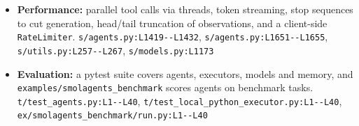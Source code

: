 \begin{itemize}
\item \textbf{Performance:} parallel tool calls via threads, token streaming, stop sequences to cut generation, head/tail truncation of observations, and a client-side \texttt{RateLimiter}. \texttt{s/\allowbreak{}agents.\allowbreak{}py:\allowbreak{}L1419-\allowbreak{}-\allowbreak{}L1432}, \texttt{s/\allowbreak{}agents.\allowbreak{}py:\allowbreak{}L1651-\allowbreak{}-\allowbreak{}L1655}, \texttt{s/\allowbreak{}utils.\allowbreak{}py:\allowbreak{}L257-\allowbreak{}-\allowbreak{}L267}, \texttt{s/\allowbreak{}models.\allowbreak{}py:\allowbreak{}L1173}
\item \textbf{Evaluation:} a pytest suite covers agents, executors, models and memory, and \texttt{examples/\allowbreak{}smolagents\_\allowbreak{}benchmark} scores agents on benchmark tasks. \texttt{t/\allowbreak{}test\_\allowbreak{}agents.\allowbreak{}py:\allowbreak{}L1-\allowbreak{}-\allowbreak{}L40}, \texttt{t/\allowbreak{}test\_\allowbreak{}local\_\allowbreak{}python\_\allowbreak{}executor.\allowbreak{}py:\allowbreak{}L1-\allowbreak{}-\allowbreak{}L40}, \texttt{ex/\allowbreak{}smolagents\_\allowbreak{}benchmark/\allowbreak{}run.\allowbreak{}py:\allowbreak{}L1-\allowbreak{}-\allowbreak{}L40}
\end{itemize}

